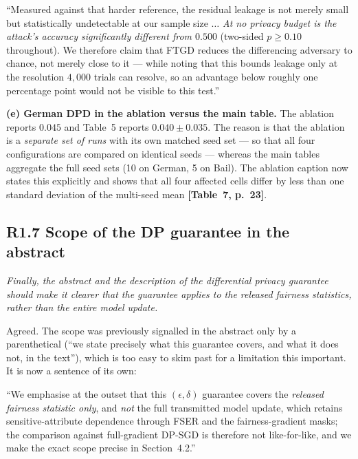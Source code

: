 \documentclass[11pt,a4paper]{article}
\newenvironment{comment}
  {\begin{mdframed}[backgroundcolor=quotegray,linewidth=0pt,skipabove=8pt,
    skipbelow=6pt,innertopmargin=6pt,innerbottommargin=6pt]\itshape}
  {\end{mdframed}}
\newenvironment{newtextbox}
  {\begin{mdframed}[linecolor=newtext!45,linewidth=0.8pt,skipabove=6pt,
    skipbelow=8pt,innertopmargin=6pt,innerbottommargin=6pt]\small}
  {\end{mdframed}}
\newcommand{\where}[1]{\textcolor{revblue}{\textbf{[#1]}}}
\begin{document}
\begin{newtextbox}
``Measured against that harder reference, the residual leakage is not merely
small but statistically undetectable at our sample size $\dots$ \emph{At no
privacy budget is the attack's accuracy significantly different from $0.500$}
(two-sided $p\ge0.10$ throughout). We therefore claim that FTGD reduces the
differencing adversary to chance, not merely close to it --- while noting that
this bounds leakage only at the resolution $4{,}000$ trials can resolve, so an
advantage below roughly one percentage point would not be visible to this test.''
\end{newtextbox}

\textbf{(e) German DPD in the ablation versus the main table.} The ablation
reports $0.045$ and Table~5 reports $0.040\pm0.035$. The reason is that the
ablation is a \emph{separate set of runs} with its own matched seed set --- so
that all four configurations are compared on identical seeds --- whereas the main
tables aggregate the full seed sets (10 on German, 5 on Bail). The ablation
caption now states this explicitly and shows that all four affected cells differ
by less than one standard deviation of the multi-seed mean
\where{Table~7, p.~23}.

\subsection*{R1.7 Scope of the DP guarantee in the abstract}
\label{sec:r1-7}

\begin{comment}
Finally, the abstract and the description of the differential privacy guarantee
should make it clearer that the guarantee applies to the released fairness
statistics, rather than the entire model update.
\end{comment}

Agreed. The scope was previously signalled in the abstract only by a
parenthetical (``we state precisely what this guarantee covers, and what it does
not, in the text''), which is too easy to skim past for a limitation this
important. It is now a sentence of its own:

\begin{newtextbox}
``We emphasise at the outset that this $(\epsilon,\delta)$ guarantee covers the
\emph{released fairness statistic only}, and \emph{not} the full transmitted
model update, which retains sensitive-attribute dependence through FSER and the
fairness-gradient masks; the comparison against full-gradient DP-SGD is
therefore not like-for-like, and we make the exact scope precise in
Section~4.2.''
\end{newtextbox}
\end{document}
